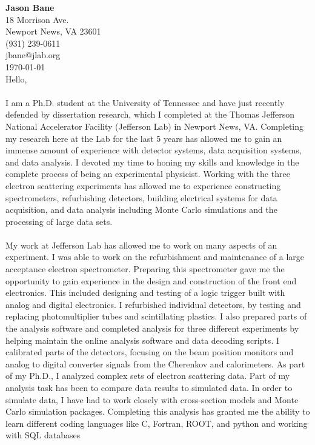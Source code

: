 \documentclass[12pt,letterpaper]{article}
\newcommand{\CPP}
{C\nolinebreak[4]\hspace{-.05em}\raisebox{.22ex}{\footnotesize\bf ++}}
\begin{document}
\vspace*{-1.2cm}
{\textbf{Jason Bane}}\\
18 Morrison Ave. \\
Newport News, VA 23601 \\
(931) 239-0611 \\
jbane@jlab.org \\
\today\\

Hello, 

\paragraph{}I am a Ph.D. student at the University of Tennessee and have just recently defended by dissertation research, which I completed at the Thomas Jefferson National Accelerator Facility (Jefferson Lab) in Newport News, VA. Completing my research here at the Lab for the last 5 years has allowed me to gain an immense amount of experience with detector systems, data acquisition systems, and data analysis. I devoted my time to honing my skills and knowledge in the complete process of being an experimental physicist. Working with the three electron scattering experiments has allowed me to experience constructing spectrometers, refurbishing detectors, building electrical systems for data acquisition, and data analysis including Monte Carlo simulations and the processing of large data sets.  
\paragraph{}My work at Jefferson Lab has allowed me to work on many aspects of an experiment. I was able to work on the refurbishment and maintenance of a large acceptance electron spectrometer. Preparing this spectrometer gave me the opportunity to gain experience in the design and construction of the front end electronics. This included designing and testing of a logic trigger built with analog and digital electronics. I refurbished individual detectors, by testing and replacing photomultiplier tubes and scintillating plastics.  
I also prepared parts of the analysis software and completed analysis for three different experiments by helping maintain the online analysis software and data decoding scripts. I calibrated parts of the detectors, focusing on the beam position monitors and analog to digital converter signals from the Cherenkov and calorimeters. As part of my Ph.D., I analyzed complex sets of electron scattering data. Part of my analysis task has been to compare data results to simulated data. In order to simulate data, I have had to work closely with cross-section models and Monte Carlo simulation packages. Completing this analysis has granted me the ability to learn different coding languages like \CPP, Fortran, ROOT, and python and working with SQL databases   
\end{document}

